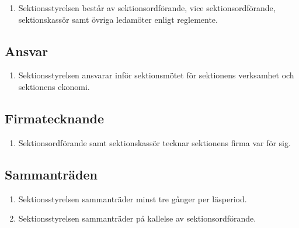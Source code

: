 \documentclass[11pt,a4paper]{article}
\begin{document}
\begin{enumerate}[\thesubsection .1]

  \item Sektionsstyrelsen består av sektionsordförande, vice sektionsordförande, sektionskassör samt övriga ledamöter enligt reglemente.
\end{enumerate}

\subsection{Ansvar}

\begin{enumerate}[\thesubsection .1]

  \item Sektionsstyrelsen ansvarar inför sektionsmötet för sektionens verksamhet och sektionens ekonomi.

\end{enumerate}

\subsection{Firmatecknande}

\begin{enumerate}[\thesubsection .1]

  \item Sektionsordförande samt sektionskassör tecknar sektionens
  firma var för sig.

\end{enumerate}

\subsection{Sammanträden}

\begin{enumerate}[\thesubsection .1]

  \item  Sektionsstyrelsen sammanträder minst tre gånger per läsperiod.

  \item Sektionsstyrelsen sammanträder på kallelse av sektionsordförande.

\end{enumerate}
\end{document}
